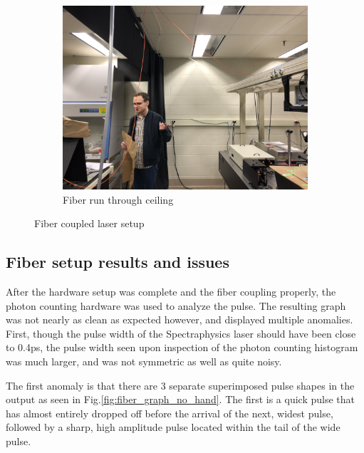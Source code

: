 \documentclass[a4paper]{article}
\begin{document}
\begin{figure}[!htb]
\begin{subfigure}[t]{0.4\textwidth}
         \includegraphics[width=\textwidth]{figures/IMG_6137.jpg}
         \caption{Fiber run through ceiling}
         \label{fig:fiber_ceiling}
         \begin{minipage}{2cm}
         \vfill
         \end{minipage}
     \end{subfigure}
        \caption{Fiber coupled laser setup}
        \label{fig:fiber}
\end{figure}

\subsection{Fiber setup results and issues}

After the hardware setup was complete and the fiber coupling properly, the photon counting hardware was used to analyze the pulse. The resulting graph was not nearly as clean as expected however, and displayed multiple anomalies. First, though the pulse width of the Spectraphysics laser should have been close to 0.4ps, the pulse width seen upon inspection of the photon counting histogram was much larger, and was not symmetric as well as quite noisy.

The first anomaly is that there are 3 separate superimposed pulse shapes in the output as seen in Fig.\ref{fig:fiber_graph_no_hand}. The first is a quick pulse that has almost entirely dropped off before the arrival of the next, widest pulse, followed by a sharp, high amplitude pulse located within the tail of the wide pulse. 
\end{document}
